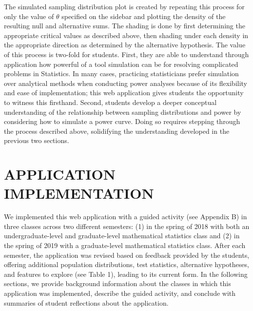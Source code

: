 \documentclass{TISE}
\begin{document}
The simulated sampling distribution plot is created by repeating this process for only the value of $\theta$ specified on the sidebar and plotting the density of the resulting null and alternative sums. The shading is done by first determining the appropriate critical values as described above, then shading under each density in the appropriate direction as determined by the alternative hypothesis. The value of this process is two-fold for students. First, they are able to understand through application how powerful of a tool simulation can be for resolving complicated problems in Statistics. In many cases, practicing statisticians prefer simulation over analytical methods when conducting power analyses because of its flexibility and ease of implementation; this web application gives students the opportunity to witness this firsthand. Second, students develop a deeper conceptual understanding of the relationship between sampling distributions and power by considering how to simulate a power curve. Doing so requires stepping through the process described above, solidifying the understanding developed in the previous two sections. 

\section{APPLICATION IMPLEMENTATION}

We implemented this web application with a guided activity (see Appendix B) in three classes across two different semesters: (1) in the spring of 2018 with both an undergraduate-level and graduate-level mathematical statistics class and (2) in the spring of 2019 with a graduate-level mathematical statistics class. After each semester, the application was revised based on feedback provided by the students, offering additional population distributions, test statistics, alternative hypotheses, and features to explore (see Table 1), leading to its current form. In the following sections, we provide background information about the classes in which this application was implemented, describe the guided activity, and conclude with summaries of student reflections about the application. 
\end{document}
